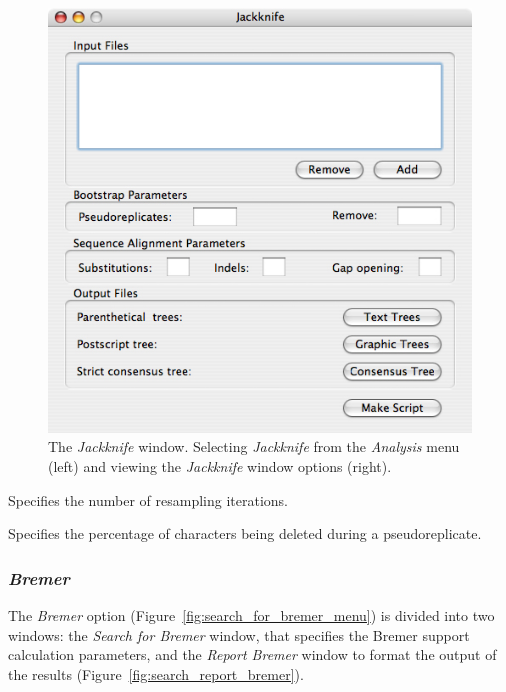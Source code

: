 {\begin{figure}
\begin{minipage}[c]{0.52\textwidth}
	   	\includegraphics[width=\textwidth]{doc/figures/jackknife_window.jpg}
   	\end{minipage}
\caption{The \emph{Jackknife} window. Selecting \emph{Jackknife} from the \emph{Analysis} menu (left) and viewing the \emph{Jackknife} window options (right).}
\label{fig:jackknife}
\end{figure}

\begin{description}
\setlength{\labelsep}{5pt}
\setlength{\itemindent}{0pt}%
    \item[Pseudoreplicates] Specifies the number of resampling iterations.
    \item[Remove] Specifies the percentage of characters being deleted during a pseudoreplicate.
\end{description}

\subsubsection*{\emph{Bremer}}

The \emph{Bremer} option (Figure~\ref{fig:search_for_bremer_menu}) is divided into two windows: the \emph{Search for Bremer} window, that specifies the Bremer support \cite{Bremer1988, Kallersjoetal1992} calculation parameters, and the \emph{Report Bremer} window to format the output of the results (Figure~\ref{fig:search_report_bremer}). 

}
